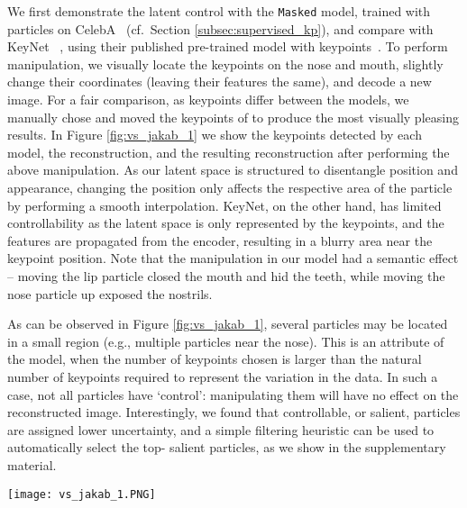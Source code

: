 \documentclass[nohyperref]{article}
\theoremstyle{plain}
\theoremstyle{definition}
\theoremstyle{remark}
\begin{document}
We first demonstrate the latent control with the \texttt{Masked} model,  trained with  particles on CelebA~\citep{liu2015faceattributes} (cf.~Section \ref{subsec:supervised_kp}), and compare with KeyNet ~\citep{jakab2018unsupervised}, using their published pre-trained model with  keypoints~\citep{keynet18code}. 
To perform manipulation, we visually locate the keypoints on the nose and mouth, slightly change their coordinates (leaving their features the same), and decode a new image. For a fair comparison, as keypoints differ between the models, we manually chose and moved the keypoints of \citet{jakab2018unsupervised} to produce the most visually pleasing results. 
In Figure \ref{fig:vs_jakab_1} we show the keypoints detected by each model, the reconstruction, and the resulting reconstruction after performing the above manipulation. As our latent space is structured to disentangle position and appearance, changing the position only affects the respective area of the particle by performing a smooth interpolation. KeyNet, on the other hand, has limited controllability as the latent space is only represented by the keypoints, and the features are propagated from the encoder, resulting in a blurry area near the keypoint position. Note that the manipulation in our model had a semantic effect -- moving the lip particle closed the mouth and hid the teeth, while moving the nose particle up exposed the nostrils.

As can be observed in Figure \ref{fig:vs_jakab_1}, several particles may be located in a small region (e.g., multiple particles near the nose). This is an attribute of the model, when the number of keypoints chosen is larger than the natural number of keypoints required to represent the variation in the data.  In such a case, not all particles have `control': manipulating them will have no effect on the reconstructed image. Interestingly, we found that controllable, or salient, particles are assigned lower uncertainty, and a simple filtering heuristic can be used to automatically select the top- salient particles, as we show in the supplementary material.

\begin{figure*}
     \centering
     \texttt{[image: vs\_jakab\_1.PNG]}
     \vspace{-2em}
        \caption{Image manipulation comparison with KeyNet~\citep{jakab2018unsupervised}. We visualize the keypoints learned by each model, the reconstruction, and the effect that moving keypoints on the nose and the mouth has on the output image.}
        \label{fig:vs_jakab_1}
\end{figure*}
\end{document}
